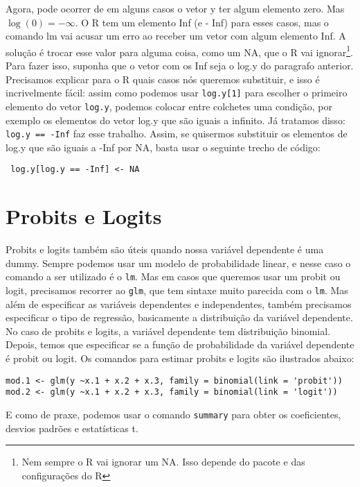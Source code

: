\documentclass[]{book}
\let\rmarkdownfootnote\footnote%
\def\footnote{\protect\rmarkdownfootnote}
\begin{document}
Agora, pode ocorrer de em alguns casos o vetor y ter algum elemento
zero. Mas \(\log(0) = -\infty\). O R tem um elemento Inf (e - Inf) para
esses casos, mas o comando lm vai acusar um erro ao receber um vetor com
algum elemento Inf. A solução é trocar esse valor para alguma coisa,
como um NA, que o R vai ignorar\footnote{Nem sempre o R vai ignorar um
  NA. Isso depende do pacote e das configurações do R}. Para fazer isso,
suponha que o vetor com os Inf seja o log.y do paragrafo anterior.
Precisamos explicar para o R quais casos nós queremos substituir, e isso
é incrivelmente fácil: assim como podemos usar \texttt{log.y{[}1{]}}
para escolher o primeiro elemento do vetor \texttt{log.y}, podemos
colocar entre colchetes uma condição, por exemplo os elementos do vetor
log.y que são iguais a infinito. Já tratamos disso:
\texttt{log.y\ ==\ -Inf} faz esse trabalho. Assim, se quisermos
substituir os elementos de log.y que são iguais a -Inf por NA, basta
usar o seguinte trecho de código:

\begin{verbatim}
 log.y[log.y == -Inf] <- NA
\end{verbatim}

\section{Probits e Logits}\label{probits-e-logits}

Probits e logits também são úteis quando nossa variável dependente é uma
dummy. Sempre podemos usar um modelo de probabilidade linear, e nesse
caso o comando a ser utilizado é o \texttt{lm}. Mas em casos que
queremos usar um probit ou logit, precisamos recorrer ao \texttt{glm},
que tem sintaxe muito parecida com o \texttt{lm}. Mas além de
especificar as variáveis dependentes e independentes, também precisamos
especificar o tipo de regressão, basicamente a distribuição da variável
dependente. No caso de probits e logits, a variável dependente tem
distribuição binomial. Depois, temos que especificar se a função de
probabilidade da variável dependente é probit ou logit. Os comandos para
estimar probits e logits são ilustrados abaixo:

\begin{verbatim}
mod.1 <- glm(y ~x.1 + x.2 + x.3, family = binomial(link = 'probit'))
mod.2 <- glm(y ~x.1 + x.2 + x.3, family = binomial(link = 'logit'))
\end{verbatim}

E como de praxe, podemos usar o comando \texttt{summary} para obter os
coeficientes, desvios padrões e estatísticas t.
\end{document}
